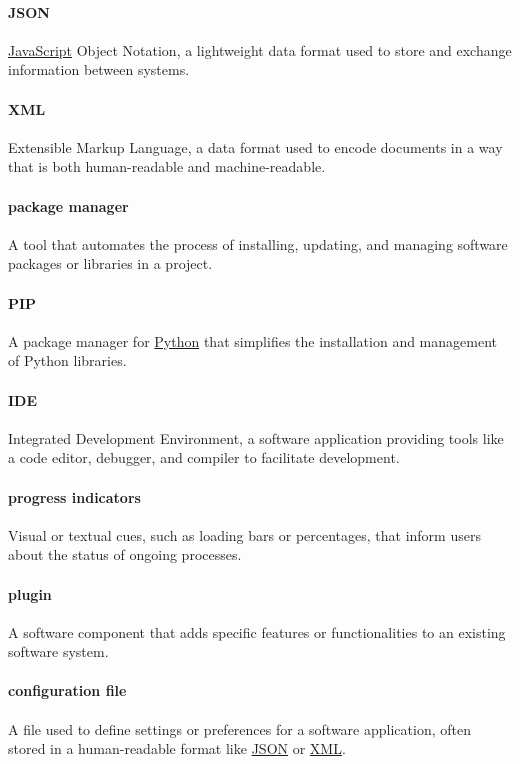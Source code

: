 \documentclass[12pt]{article}
\begin{document}
\paragraph*{JSON}
\label{term:JSON}
\hyperref[term:JS]{JavaScript} Object Notation, a lightweight data
format used to store and exchange information between systems.

\paragraph*{XML}
\label{term:XML}
Extensible Markup Language, a data format used to encode documents in
a way that is both human-readable and machine-readable.

\paragraph*{package manager}
A tool that automates the process of installing, updating, and
managing software packages or libraries in a project.

\paragraph*{PIP}
A package manager for \hyperref[term:python]{Python} that simplifies
the installation and management of Python libraries.

\paragraph*{IDE}
Integrated Development Environment, a software application providing
tools like a code editor, debugger, and compiler to facilitate development.

\paragraph*{progress indicators}
Visual or textual cues, such as loading bars or percentages, that
inform users about the status of ongoing processes.

\paragraph*{plugin}
A software component that adds specific features or functionalities
to an existing software system.

\paragraph*{configuration file}
A file used to define settings or preferences for a software
application, often stored in a human-readable format like
\hyperref[term:JSON]{JSON} or \hyperref[term:XML]{XML}.
\end{document}
